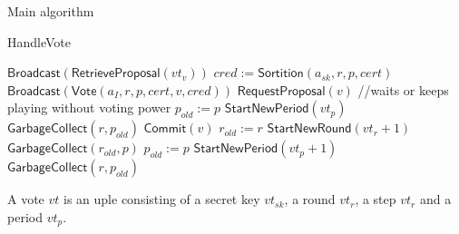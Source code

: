 \documentclass[10pt,a4paper]{article}
\begin{document}
\begin{section}{Main algorithm}
\begin{subsection}{HandleVote}
\begin{algorithm}[H]
\begin{algorithmic}[1]
                    \State $\mathsf{Broadcast}(\mathsf{RetrieveProposal}(vt_v))$
                \EndIf
                        \State $cred := 
                        \mathsf{Sortition}(a_{sk}, r,p,cert)$
                            \State $\mathsf{Broadcast}(\mathsf{Vote}(a_I, r, p, cert, v, cred))$
                        \EndIf
                    \EndFor
                \EndIf
                        \State $\mathsf{RequestProposal}(v)$ //waits or keeps playing without voting power
                            \State $p_{old} := p$
                            \State $\mathsf{StartNewPeriod}(vt_p)$
                            \State $\mathsf{GarbageCollect}(r, p_{old})$
                        \EndIf
                    \EndIf
                    \State $\mathsf{Commit}(v)$  %
                    \State $r_{old} := r$
                    \State $\mathsf{StartNewRound}(vt_r+1)$
                    \State $\mathsf{GarbageCollect}(r_{old}, p)$
                \EndIf
                    \State $p_{old} := p$
                    \State $\mathsf{StartNewPeriod}(vt_p + 1)$
                    \State $\mathsf{GarbageCollect}(r, p_{old})$
                \EndIf
            \EndIf

        \EndFunction
        \end{algorithmic}
    \end{algorithm}
    
A vote $vt$ is an uple consisting of a secret key $vt_{sk}$, a round $vt_r$, a step $vt_r$ and a period $vt_p$.
    

\end{subsection}
\end{section}
\end{document}
